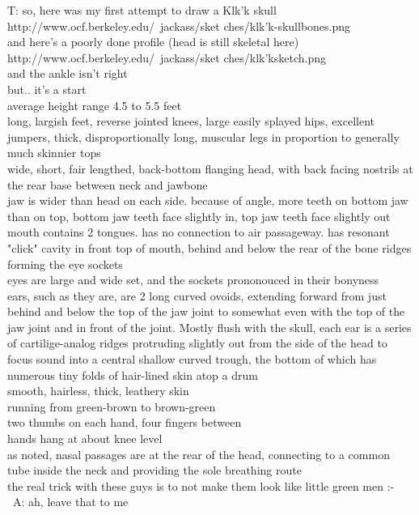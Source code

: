 T: so, here was my first attempt to draw a Klk'k skull http://www.ocf.berkeley.edu/~jackass/sket ches/klk'k-skullbones.png\\
and here's a poorly done profile (head is still skeletal here) http://www.ocf.berkeley.edu/~jackass/sket ches/klk'ksketch.png\\
and the ankle isn't right\\
but.. it's a start\\
average height range 4.5 to 5.5 feet\\
long, largish feet, reverse jointed knees, large easily splayed hips, excellent jumpers, thick, disproportionally long, muscular legs in proportion to generally much skinnier tops\\
wide, short, fair lengthed, back-bottom flanging head, with back facing nostrils at the rear base between neck and jawbone\\
jaw is wider than head on each side. because of angle, more teeth on bottom jaw than on top, bottom jaw teeth face slightly in, top jaw teeth face slightly out\\
mouth contains 2 tongues. has no connection to air passageway. has resonant "click" cavity in front top of mouth, behind and below the rear of the bone ridges forming the eye sockets\\
eyes are large and wide set, and the sockets prononouced in their bonyness\\
ears, such as they are, are 2 long curved ovoids, extending forward from just behind and below the top of the jaw joint to somewhat even with the top of the jaw joint and in front of the joint. Mostly flush with the skull, each ear is a series of cartilige-analog ridges protruding slightly out from the side of the head to focus sound into a central shallow curved trough, the bottom of which has numerous tiny folds of hair-lined skin atop a drum\\
smooth, hairless, thick, leathery skin\\
running from green-brown to brown-green\\
two thumbs on each hand, four fingers between\\
hands hang at about knee level\\
 as noted, nasal passages are at the rear of the head, connecting to a common tube inside the neck and providing the sole breathing route\\
the real trick with these guys is to not make them look like little green men :-\\\
A: ah, leave that to me\\
